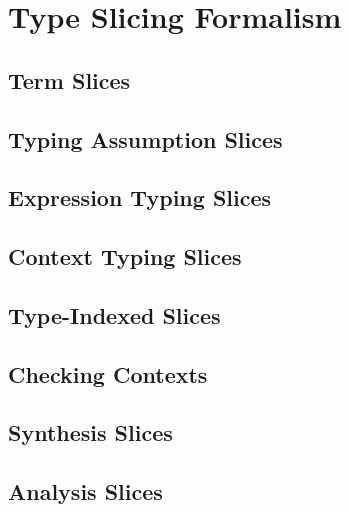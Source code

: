 \section{Type Slicing Formalism}
\label{sec:formalism}

\subsection{Term Slices}
\label{sec:term-slices}

\subsection{Typing Assumption Slices}
\label{sec:typing-assumption-slices}

\subsection{Expression Typing Slices}
\label{sec:expression-typing-slices}

\subsection{Context Typing Slices}
\label{sec:context-typing-slices}

\subsection{Type-Indexed Slices}
\label{sec:type-indexed-slices}

\subsection{Checking Contexts}
\label{sec:checking-contexts}

\subsection{Synthesis Slices}
\label{sec:synthesis-slices}

\subsection{Analysis Slices}
\label{sec:analysis-slices}

